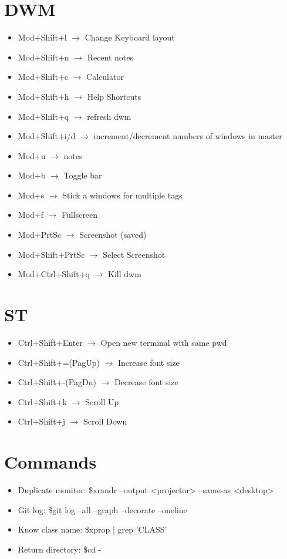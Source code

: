 \documentclass[a4paper,10pt]{article}
\begin{document}
\section{DWM}
\begin{itemize}
  \item Mod+Shift+l $\to$ Change Keyboard layout
  \item Mod+Shift+n $\to$ Recent notes
  \item Mod+Shift+c $\to$ Calculator
  \item Mod+Shift+h $\to$ Help Shortcuts
  \item Mod+Shift+q $\to$ refresh dwm
  \item Mod+Shift+i/d $\to$ increment/decrement numbers of windows in master
  \item Mod+n $\to$ notes
  \item Mod+b $\to$ Toggle bar
  \item Mod+s $\to$ Stick a windows for multiple tags
  \item Mod+f $\to$ Fullscreen
  \item Mod+PrtSc $\to$ Screenshot (saved)
  \item Mod+Shift+PrtSc $\to$ Select Screenshot
  \item Mod+Ctrl+Shift+q $\to$ Kill dwm
\end{itemize}

\section{ST}
\begin{itemize}
  \item Ctrl+Shift+Enter $\to$ Open new terminal with same pwd
  \item Ctrl+Shift+=(PagUp) $\to$ Increase font size
  \item Ctrl+Shift+-(PagDn) $\to$ Decrease font size
  \item Ctrl+Shift+k $\to$ Scroll Up
  \item Ctrl+Shift+j $\to$ Scroll Down
\end{itemize}
\section{Commands}
\begin{itemize}
  \item Duplicate monitor: \$xrandr --output <projector> --same-as <desktop>
  \item Git log: \$git log --all --graph --decorate --oneline
  \item Know class name: \$xprop | grep 'CLASS'
  \item Return directory: \$cd -
\end{itemize}
    \newpage
\end{document}
